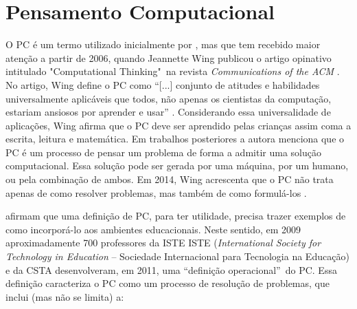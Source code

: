 



\section{Pensamento Computacional}
\label{fundamentacao_pc}

O \acl{PC} é um termo utilizado inicialmente por , mas que tem recebido maior atenção a partir de 2006, quando Jeannette Wing publicou o artigo opinativo intitulado "Computational Thinking"\ na revista \textit{Communications of the ACM} \cite{wing_computational_2006}. No artigo, Wing define o \ac{PC} como “[...] conjunto de atitudes e habilidades universalmente aplicáveis que todos, não apenas os cientistas da computação, estariam ansiosos por aprender e usar” \cite[p.33, tradução nossa]{wing_computational_2006}. Considerando essa universalidade de aplicações, Wing afirma que o \ac{PC} deve ser aprendido pelas crianças assim coma a escrita, leitura e matemática. Em trabalhos posteriores a autora menciona que o \acl{PC} é um processo de pensar um problema de forma a admitir uma solução computacional. Essa solução pode ser gerada por uma máquina, por um humano, ou pela combinação de ambos. Em 2014, Wing acrescenta que o \ac{PC} não trata apenas de como resolver problemas, mas também de como formulá-los \cite{wing_computational_2014}.

 afirmam que uma definição de \ac{PC}, para ter utilidade, precisa trazer exemplos de como incorporá-lo aos ambientes educacionais. Neste sentido, em 2009 aproximadamente 700 professores da \ac{ISTE} ISTE (\textit{International Society for Technology in Education} -- Sociedade Internacional para Tecnologia na Educação) e da \ac{CSTA} desenvolveram, em 2011, uma “definição operacional”\ do \acl{PC}. Essa definição caracteriza o \ac{PC} como um processo de resolução de problemas, que inclui (mas não se limita) a:

